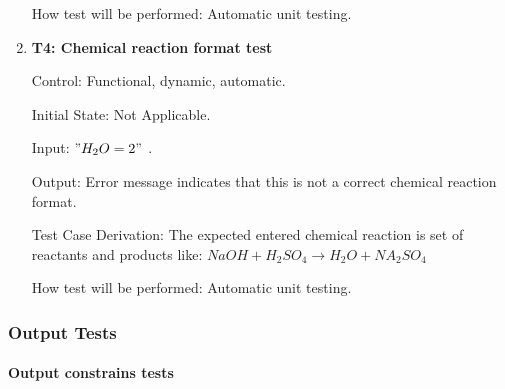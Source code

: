 \documentclass[12pt, titlepage]{article}
\begin{document}
\begin{enumerate}
How test will be performed: Automatic unit testing.


\item{\bf T4: Chemical reaction format test\\}

Control: Functional, dynamic, automatic.
					
Initial State: Not Applicable.
					
Input: $"H_2O = 2"$ . 
					
Output: Error message indicates that this is not a correct chemical reaction
format.

Test Case Derivation: The expected entered chemical reaction is set of reactants
and products like: $NaOH + H_2SO_4 \rightarrow H_2O + NA_2SO_4$
					
How test will be performed: Automatic unit testing.
 
\end{enumerate}

\subsubsection{Output Tests}

\paragraph{Output constrains tests}
\end{document}
